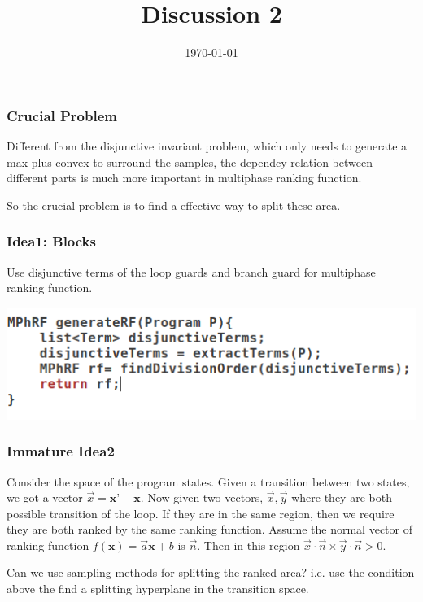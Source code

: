 \documentclass[10pt]{beamer}
\title{Discussion 2}
\date{\today}
\begin{document}
\maketitle


\begin{frame}\frametitle{Crucial Problem}
Different from the disjunctive invariant problem, which only needs to generate a max-plus convex to surround the samples, the dependcy relation between different parts is much more important in multiphase ranking function.

So the crucial problem is to find a effective way to split these area.

\end{frame}


\begin{frame}\frametitle{Idea1: Blocks}
Use disjunctive terms of the loop guards and branch guard for multiphase ranking function.
\begin{center}
\includegraphics[scale=0.5]{2.png}
\end{center}
\end{frame}

\begin{frame}\frametitle{Immature Idea2}
Consider the space of the program states. Given a transition between two states, we got a vector $\vec{x} = \textbf{x'} - \textbf{x}$. Now given two vectors, $\vec{x}, \vec{y}$ where they are both possible transition of the loop. If they are in the same region, then we require they are both ranked by the same ranking function. Assume  the normal vector of ranking function $f(\textbf{x}) = \vec{a}\textbf{x} + b$ is $\vec{n}$. Then in this region $\vec{x}\cdot\vec{n} \times \vec{y}\cdot\vec{n} > 0$. 

Can we use sampling methods for splitting the ranked area? i.e. use the condition above the find a splitting hyperplane in the transition space.





\end{frame}
\end{document}
